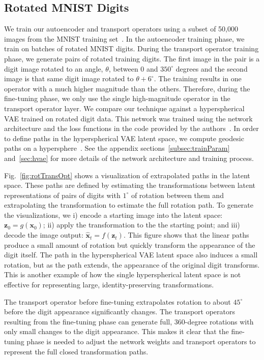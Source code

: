 \documentclass[letterpaper]{article} %
\newcommand{\vtr}[1]{\ensuremath{\mathbf{#1}}}
\begin{document}
\subsection{Rotated MNIST Digits}
We train our autoencoder and transport operators using a subset of 50,000 images from the MNIST training set~\cite{lecun1998gradient}. In the autoencoder training phase, we train on batches of rotated MNIST digits. During the transport operator training phase, we generate pairs of rotated training digits. The first image in the pair is a digit image rotated to an angle, $\theta$, between 0 and $350^{\circ}$ degrees and the second image is that same digit image rotated to $\theta + 6^{\circ}$. The training results in one operator with a much higher magnitude than the others. Therefore, during the fine-tuning phase, we only use the single high-magnitude operator in the transport operator layer. We compare our technique against a hyperspherical VAE trained on rotated digit data. This network was trained using the network architecture and the loss functions in the code provided by the authors~\cite{davidson2018hyperspherical}.  In order to define paths in the hyperspherical VAE latent space, we compute geodesic paths on a hypersphere~\cite{Ber17}. See the appendix sections~\ref{subsec:trainParam} and~\ref{sec:hvae} for more details of the network architecture and training process. 


Fig.~\ref{fig:rotTransOpt} shows a visualization of extrapolated paths in the latent space. These paths are defined by estimating the transformations between latent representations of pairs of digits with $1^{\circ}$ of rotation between them and extrapolating the transformation to estimate the full rotation path. To generate the visualizations, we i) encode a starting image into the latent space: $\vtr{z}_0 = g(\vtr{x}_0)$; ii) apply the transformation to the the starting point; and iii) decode the image output: $\hat{\vtr{x}}_t = f(\vtr{z}_t)$. This figure shows that the linear paths produce a small amount of rotation but quickly transform the appearance of the digit itself. The path in the hyperspherical VAE latent space also induces a small rotation, but as the path extends, the appearance of the original digit transforms. This is another example of how the single hyperspherical latent space is not effective for representing large, identity-preserving transformations.

The transport operator before fine-tuning extrapolates rotation to about $45^{\circ}$ before the digit appearance significantly changes. The transport operators resulting from the fine-tuning phase can generate full, 360-degree rotations with only small changes to the digit appearance. This makes it clear that the fine-tuning phase is needed to adjust the network weights and transport operators to represent the full closed transformation paths.
\end{document}
